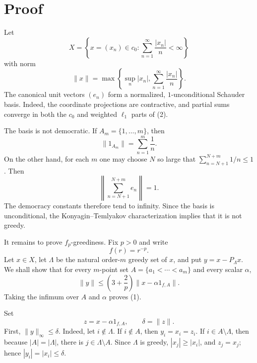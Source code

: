 \documentclass[11pt]{article}
\theoremstyle{definition}
\begin{document}
\section*{Proof}

Let
\[
        X=\left\{x=(x_n)\in c_0:
        \sum_{n=1}^\infty \frac{|x_n|}{n}<\infty\right\}
\]
with norm
\[
        \|x\|=\max\left\{\sup_n |x_n|,
        \sum_{n=1}^\infty \frac{|x_n|}{n}\right\}.
        \tag{2}
\]
The canonical unit vectors \((e_n)\) form a normalized, \(1\)-unconditional
Schauder basis.  Indeed, the coordinate projections are contractive, and
partial sums converge in both the \(c_0\) and weighted \(\ell_1\) parts of
(2).

The basis is not democratic.  If \(A_m=\{1,\ldots,m\}\), then
\[
        \|1_{A_m}\|=\sum_{n=1}^m \frac{1}{n}.
\]
On the other hand, for each \(m\) one may choose \(N\) so large that
\(\sum_{n=N+1}^{N+m}1/n\le 1\).  Then
\[
        \left\|\sum_{n=N+1}^{N+m}e_n\right\|=1.
\]
The democracy constants therefore tend to infinity.  Since the basis is
unconditional, the Konyagin--Temlyakov characterization implies that it is not
greedy.

It remains to prove \(f_p\)-greediness.  Fix \(p>0\) and write
\[
        f(r)=r^{-p}.
\]
Let \(x\in X\), let \(\Lambda\) be the natural order-\(m\) greedy set of \(x\),
and put \(y=x-P_\Lambda x\).  We shall show that for every \(m\)-point set
\(A=\{a_1<\cdots<a_m\}\) and every scalar \(\alpha\),
\[
        \|y\|\le \left(3+\frac{2}{p}\right)
        \|x-\alpha 1_{f,A}\|.
        \tag{3}
\]
Taking the infimum over \(A\) and \(\alpha\) proves (1).

Set
\[
        z=x-\alpha 1_{f,A},\qquad \delta=\|z\|.
\]
First, \(\|y\|_\infty\le \delta\).  Indeed, let \(i\notin\Lambda\).  If
\(i\notin A\), then \(y_i=x_i=z_i\).  If \(i\in A\setminus\Lambda\), then
because \(|A|=|\Lambda|\), there is \(j\in\Lambda\setminus A\).  Since
\(\Lambda\) is greedy, \(|x_j|\ge |x_i|\), and \(z_j=x_j\); hence
\(|y_i|=|x_i|\le\delta\).
\end{document}
